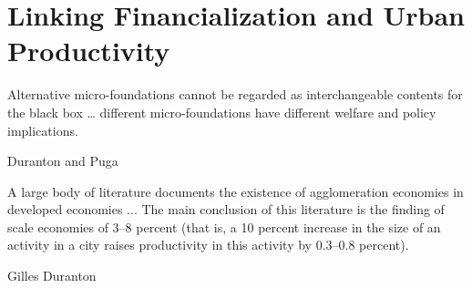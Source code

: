 \chapter{Linking Financialization and Urban Productivity} \label{chapter-tramsmission}%

\epigraph{Alternative micro-foundations cannot be regarded as interchangeable contents for the black box \dots %
different micro-foundations have different welfare and policy implications. %
}{Duranton and Puga \cite{durantonMicroFoundationsUrbanAgglomeration2004}}

\epigraph{A large body of literature documents the existence of agglomeration economies in developed economies ... The main conclusion of this literature is the finding of scale economies of 3--8 percent (that is, a 10 percent increase in the size of an activity in a city raises productivity in this activity by 0.3--0.8 percent).}{Gilles Duranton \cite{durantonAreCitiesEngines2009}} %




